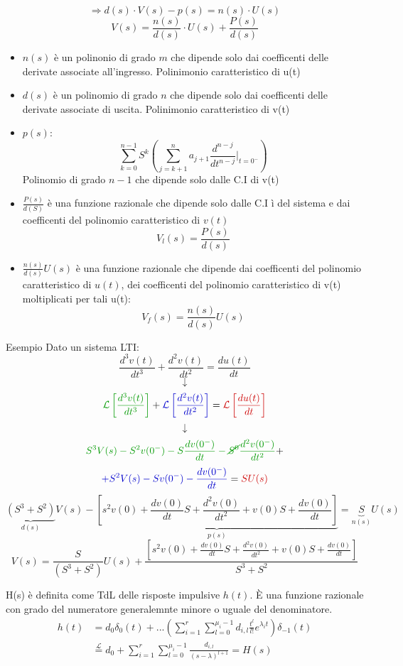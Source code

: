 \documentclass[a4paper]{article}
\begin{document}
\[\Longrightarrow d(s) \cdot V(s) - p(s) = n(s) \cdot U(s)\]
\[V(s) = \frac{n(s)}{d(s)} \cdot U(s) + \frac{P(s)}{d(s)}\]
\begin{itemize}
    \item \textcolor{green!70!black}{$n(s)$} è un polinonio di grado $m$
    che dipende solo dai coefficenti delle derivate associate all'ingresso. \colorbox{blue!30!white}{Polinimonio caratteristico di u(t)}
    \item \textcolor{green!70!black}{$d(s)$} è un polinomio di grado $n$ che dipende
    solo dai coefficenti delle derivate associate di uscita. \colorbox{blue!30!white}{Polinimonio caratteristico di v(t)}
    \item \textcolor{green!70!black}{$p(s):$}\[\sum_{k=0}^{n-1}S^k\left(\sum_{j=k+1}^{n} a_{j+1} \frac{d^{n-j}}{dt^{n-j}}\bigg|_{t=0^-}\right)\]
    Polinomio di grado $n-1$ che dipende solo dalle C.I di v(t)
    \item \textcolor{green!70!black}{$\frac{P(s)}{d(S)}$} è una funzione razionale che dipende solo dalle C.I ì del sistema e dai 
    coefficenti del polinomio caratteristico di $v(t)$
    \[V_l(s) = \frac{P(s)}{d(s)}\]
    \item \textcolor{green!70!black}{$\frac{n(s)}{d(s)}U(s)$} è una funzione razionale che dipende dai coefficenti
    del polinomio caratteristico di $u(t)$, dei coefficenti del polinomio caratteristico di v(t) moltiplicati per tali u(t):
    \[V_f(s) = \frac{n(s)}{d(s)}U(s)\]
\end{itemize}

\begin{examplebox}{Esempio}
    Dato un sistema LTI:
    \[\frac{d^3v(t)}{dt^3} + \frac{d^2v(t)}{dt^2} = \frac{du(t)}{dt}\]
    \[\downarrow\]
    \[\textcolor{green!60!black}{\mathcal{L}\left[\frac{d^3v(t)}{dt^3}\right]} + \textcolor{blue!80!black}{\mathcal{L}\left[\frac{d^2v(t)}{dt^2}\right]} = \textcolor{red!80!black}{\mathcal{L}\left[\frac{du(t)}{dt}\right]}\]
    \[\downarrow\]
    \[\textcolor{green!60!black}{S^3V(s) - S^2v(0^-) - S\frac{dv(0^-)}{dt} - \cancel{S^0}\frac{d^2v(0^-)}{dt^2}} +\]
    \[\textcolor{blue!80!black}{+ S^2V(s) - Sv(0^-) - \frac{dv(0^-)}{dt}} = \textcolor{red!80!black}{SU(s)}\]
    \[\underbrace{(S^3 + S^2)}_{d(s)}V(s) - \underbrace{\left[s^2v(0) + \frac{dv(0)}{dt}S + \frac{d^2v(0)}{dt^2} + v(0)S + \frac{dv(0)}{dt}\right]}_{p(s)} = \underbrace{S}_{n(s)}U(s)\]
    \[V(s) = \frac{S}{(S^3 + S^2)}U(s) + \frac{\left[s^2v(0) + \frac{dv(0)}{dt}S + \frac{d^2v(0)}{dt^2} + v(0)S + \frac{dv(0)}{dt}\right]}{S^3 + S^2}\]
\end{examplebox}
\noindent
H(s) è definita come TdL delle risposte impulsive $h(t)$. È una funzione razionale con grado del numeratore 
generalemnte minore o uguale del denominatore.
\begin{align*}
    h(t) &= d_0 \delta_0(t) + ... \left(\sum_{i=1}^{r} \sum_{l=0}^{\mu_i - 1} d_{i,l}\frac{t^l}{l!}e^{\lambda_i t}\right)\delta_{-1}(t)\\
    &\stackrel{\mathcal{L}}{=} d_0 + \sum_{i=1}^{r} \sum_{l=0}^{\mu_i - 1} \frac{d_{i,l}}{(s-\lambda)^{l+1}} = H(s)
\end{align*}
\end{document}
